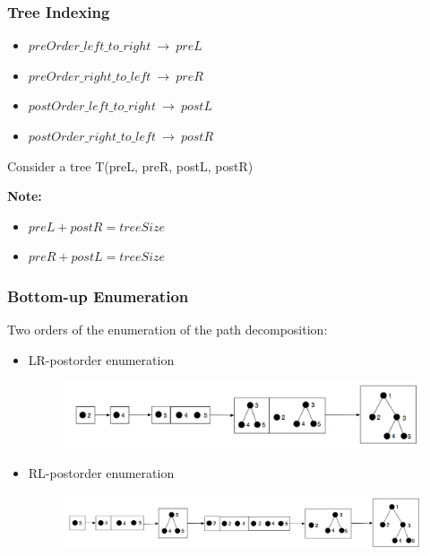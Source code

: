 \documentclass{beamer}
\begin{document}
\begin{frame}
\frametitle{Tree Indexing}
\begin{itemize}
\item $preOrder\_left\_to\_right\ \to\ preL\ $
\item $preOrder\_right\_to\_left\ \to\ preR\ $
\item $postOrder\_left\_to\_right\ \to\ postL\ $
\item $postOrder\_right\_to\_left\ \to\ postR\ $
\end{itemize}
Consider a tree T(preL, preR, postL, postR)

\begingroup

\centering
{}

\endgroup
\textbf{Note:}
\begin{itemize}
\item $preL + postR= treeSize$
\item $preR + postL= treeSize$
\end{itemize}
\end{frame}
\begin{frame}
\frametitle{Bottom-up Enumeration}
Two orders of the enumeration of the path decomposition:
\begin{itemize}
\item LR-postorder enumeration%
\begin{figure}
	\includegraphics[width=0.9\linewidth]{LRPostorder}
	\centering
\end{figure}
\item RL-postorder enumeration%
\begin{figure}
	\includegraphics[width=1.0\linewidth]{RLPostorder}
	\centering
\end{figure}
\end{itemize}
\end{frame}
\end{document}

